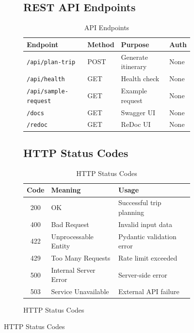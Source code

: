 \documentclass[12pt,a4paper]{report}
\newcommand{\code}[1]{\texttt{#1}}
\begin{document}
\begin{figure}[H]
\begin{plantuml}
\begin{figure}[H]
\begin{plantuml}
\subsection{REST API Endpoints}

\begin{table}[H]
\centering
\begin{tabular}{|l|l|l|l|}
\hline
\textbf{Endpoint} & \textbf{Method} & \textbf{Purpose} & \textbf{Auth} \\
\hline
\code{/api/plan-trip} & POST & Generate itinerary & None \\
\hline
\code{/api/health} & GET & Health check & None \\
\hline
\code{/api/sample-request} & GET & Example request & None \\
\hline
\code{/docs} & GET & Swagger UI & None \\
\hline
\code{/redoc} & GET & ReDoc UI & None \\
\hline
\end{tabular}
\caption{API Endpoints}
\label{tab:api-endpoints}
\end{table}

\subsection{HTTP Status Codes}

\begin{table}[H]
\centering
\begin{tabular}{|c|l|p{7cm}|}
\hline
\textbf{Code} & \textbf{Meaning} & \textbf{Usage} \\
\hline
200 & OK & Successful trip planning \\
\hline
400 & Bad Request & Invalid input data \\
\hline
422 & Unprocessable Entity & Pydantic validation error \\
\hline
429 & Too Many Requests & Rate limit exceeded \\
\hline
500 & Internal Server Error & Server-side error \\
\hline
503 & Service Unavailable & External API failure \\
\hline
\end{tabular}
\caption{HTTP Status Codes}
\label{tab:http-status}
\end{table}



\end{plantuml}
\end{figure}
\end{plantuml}
\end{figure}
\end{document}
